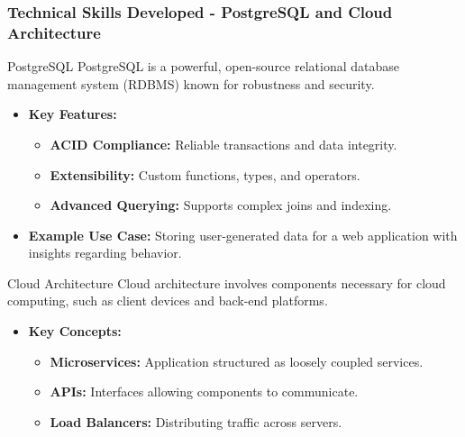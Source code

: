 \documentclass[aspectratio=169]{beamer}
\begin{document}
\begin{frame}[fragile]
    \frametitle{Technical Skills Developed - PostgreSQL and Cloud Architecture}
    \begin{block}{PostgreSQL}
        PostgreSQL is a powerful, open-source relational database management system (RDBMS) known for robustness and security.
    \end{block}
    \begin{itemize}
        \item \textbf{Key Features:}
            \begin{itemize}
                \item \textbf{ACID Compliance:} Reliable transactions and data integrity.
                \item \textbf{Extensibility:} Custom functions, types, and operators.
                \item \textbf{Advanced Querying:} Supports complex joins and indexing.
            \end{itemize}
        \item \textbf{Example Use Case:} Storing user-generated data for a web application with insights regarding behavior.
    \end{itemize}
    
    \begin{block}{Cloud Architecture}
        Cloud architecture involves components necessary for cloud computing, such as client devices and back-end platforms.
    \end{block}
    \begin{itemize}
        \item \textbf{Key Concepts:}
            \begin{itemize}
                \item \textbf{Microservices:} Application structured as loosely coupled services.
                \item \textbf{APIs:} Interfaces allowing components to communicate.
                \item \textbf{Load Balancers:} Distributing traffic across servers.
            \end{itemize}
    \end{itemize}
\end{frame}
\end{document}
